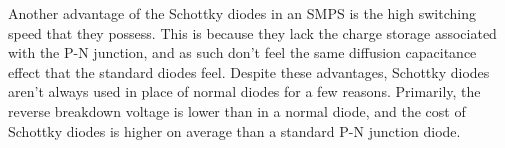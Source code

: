 Another advantage of the Schottky diodes in an SMPS
is the high switching speed that they possess. This
is because they lack the charge storage associated with
the P-N junction, and as such don't feel the same diffusion
capacitance effect that the standard diodes feel. Despite
these advantages, Schottky diodes aren't always used
in place of normal diodes for a few reasons. Primarily,
the reverse breakdown voltage is lower than in a normal
diode, and the cost of Schottky diodes is higher on
average than a standard P-N junction diode.

